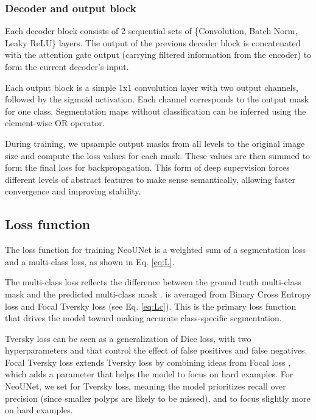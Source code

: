 \documentclass[runningheads]{llncs}
\newcommand{\ModelName}{NeoUNet\xspace}
\begin{document}
	\subsubsection{Decoder and output block}
	Each decoder block consists of 2 sequential sets of \{Convolution, Batch Norm, Leaky ReLU\} layers. The output of the previous decoder block is concatenated with the attention gate output (carrying filtered information from the encoder) to form the current decoder's input.

	Each output block is a simple 1x1 convolution layer with two output channels, followed by the sigmoid activation. Each channel corresponds to the output mask for one class. Segmentation maps without classification can be inferred using the element-wise OR operator.

	During training, we upsample output masks from all levels to the original image size and compute the loss values for each mask. These values are then summed to form the final loss for backpropagation. This form of deep supervision forces different levels of abstract features to make sense semantically, allowing faster convergence and improving stability.

	\subsection{Loss function}
	The loss function for training \ModelName is a weighted sum of a segmentation loss and a multi-class loss, as shown in Eq. \eqref{eq:L}.
	

	The multi-class loss  reflects the difference between the ground truth multi-class mask  and the predicted multi-class mask .  is averaged from Binary Cross Entropy loss and Focal Tversky loss \cite{abraham2019novel} (see Eq. \eqref{eq:Lc}). This is the primary loss function that drives the model toward making accurate class-specific segmentation.

	

	Tversky loss \cite{salehi2017tversky} can be seen as a generalization of Dice loss, with two hyperparameters  and  that control the effect of false positives and false negatives. Focal Tversky loss \cite{abraham2019novel} extends Tversky loss by combining ideas from Focal loss \cite{lin2017focal}, which adds a parameter  that helps the model to focus on hard examples. For \ModelName, we set  for Tversky loss, meaning the model prioritizes recall over precision (since smaller polyps are likely to be missed), and  to focus slightly more on hard examples.
\end{document}
